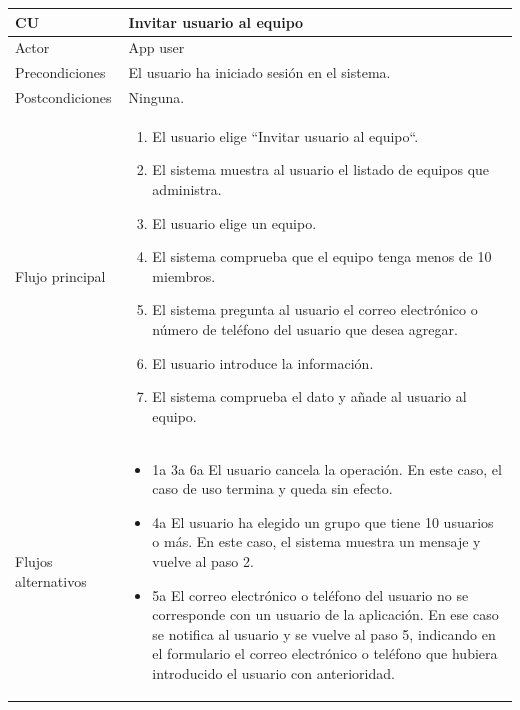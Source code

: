 \documentclass[twoside]{report}
\newcommand\addrow[2]{#1 &#2\\ }
\newcommand\addheading[2]{#1 &#2\\ \hline}
\newcommand\tabularhead{\begin{tabular}{lp{0.7\textwidth}}
\hline
}
\newenvironment{usecase}{\tabularhead}
{\hline\end{tabular}}
\begin{document}
\begin{usecase}
  \addheading{\textbf{CU\arabic{usecase}}}{Invitar usuario al equipo} 
  \addrow{Actor}{App user}
  \addrow{Precondiciones}{El usuario ha iniciado sesión en el sistema.}
  \addrow{Postcondiciones}{Ninguna.}
  \addrow{Flujo principal}{
  		\begin{enumerate}
  		\item El usuario elige “Invitar usuario al equipo“. %
  		\item El sistema muestra al usuario el listado de equipos que administra. %
  		\item El usuario elige un equipo. %
  		\item El sistema comprueba que el equipo tenga menos de 10 miembros. %
  		\item El sistema pregunta al usuario el correo electrónico o número de teléfono del usuario que desea agregar. %
  		\item El usuario introduce la información. %
  		\item El sistema comprueba el dato y añade al usuario al equipo. %
  		\end{enumerate}
  }
  \addrow{Flujos alternativos}{
  		\begin{itemize}
  		\item 1a 3a 6a El usuario cancela la operación. En este caso, el caso de uso termina y queda sin efecto.
  		\item 4a El usuario ha elegido un grupo que tiene 10 usuarios o más. En este caso, el sistema muestra un mensaje y vuelve al paso 2.
  		\item 5a El correo electrónico o teléfono del usuario no se corresponde con un usuario de la aplicación. En ese caso se notifica al usuario y se vuelve al paso 5, indicando en el formulario el correo electrónico o teléfono que hubiera introducido el usuario con anterioridad.
  		\end{itemize}
  }
\end{usecase}\\
\end{document}
